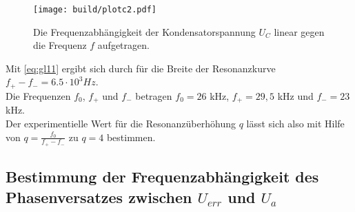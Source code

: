 \begin{figure}
  \centering
  \texttt{[image: build/plotc2.pdf]}
  \caption{Die Frequenzabhängigkeit der Kondensatorspannung $U_C$ linear gegen die Frequenz $f$ aufgetragen.}
  \label{fig:plotc2}
\end{figure}

Mit \autoref{eq:gl11} ergibt sich durch für die Breite der Resonanzkurve $f_+ - f_- = 6.5 \cdot 10^3 Hz$. \\
Die Frequenzen $f_0$, $f_+$ und $f_-$ betragen $f_0 = 26$ kHz, $f_+ = 29,5$ kHz und $f_- = 23$ kHz. \\
Der experimentielle Wert für die Resonanzüberhöhung $q$ lässt sich also mit Hilfe von $q = \frac{f_0}{f_+ - f_-}$ zu $q = 4$ bestimmen. \\




\subsection{Bestimmung der Frequenzabhängigkeit des Phasenversatzes zwischen $U_{err}$ und $U_{a}$}
\label{Phasenversatz}


